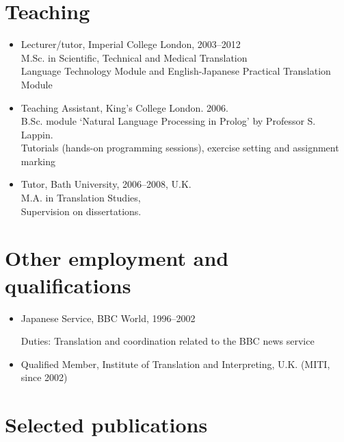 \documentclass[a4paper]{article}
\begin{document}
\section*{Teaching}
\begin{itemize}

\item Lecturer/tutor, Imperial College London,  2003--2012\\
   M.Sc. in Scientific, Technical and Medical Translation \\
   Language Technology Module and English-Japanese Practical Translation Module

\item Teaching Assistant, King's College London. 2006.\\
    B.Sc. module `Natural Language Processing in Prolog' by Professor S. Lappin.\\
   Tutorials (hands-on programming sessions), exercise setting and assignment marking



\item Tutor, Bath University, 2006--2008, U.K.\\
   M.A. in Translation Studies, \\Supervision on dissertations.


\end{itemize}

\section*{Other employment and qualifications}

\begin{itemize}

\item Japanese Service, BBC World, 1996--2002

Duties: Translation and coordination related to the BBC news service


\item Qualified Member, Institute of Translation and Interpreting, U.K. (MITI, since 2002)
\end{itemize}



\section*{Selected publications}
\end{document}
